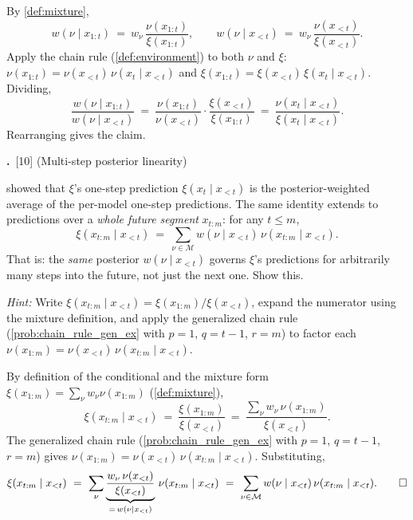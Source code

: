 \documentclass[fontsize=11pt, parskip=half]{scrartcl}
\theoremstyle{definition}
\newenvironment{solution}{%
    \begin{tcolorbox}[colback=black!5!white, colframe=black!50!white,
      title={\textbf{Solution}}, fonttitle=\normalfont, breakable]
  }{\end{tcolorbox}}
\newenvironment{solution}{\expandafter\comment}{\expandafter\endcomment}
\newcommand{\mysubsection}[2]{\par\medskip\noindent\refstepcounter{subsection}\textbf{\thesubsection.}~#2\par\smallskip}
\newcommand{\Mc}{\mathcal{M}}
\begin{document}
\begin{solution}
By \cref{def:mixture},
\[
  w(\nu \mid x_{1:t}) ~=~ w_\nu \,\frac{\nu(x_{1:t})}{\xi(x_{1:t})},
  \qquad
  w(\nu \mid x_{<t}) ~=~ w_\nu \,\frac{\nu(x_{<t})}{\xi(x_{<t})}.
\]
Apply the chain rule (\cref{def:environment}) to both $\nu$ and $\xi$: $\nu(x_{1:t}) = \nu(x_{<t})\,\nu(x_t \mid x_{<t})$ and $\xi(x_{1:t}) = \xi(x_{<t})\,\xi(x_t \mid x_{<t})$. Dividing,
\[
  \frac{w(\nu \mid x_{1:t})}{w(\nu \mid x_{<t})}
  ~=~ \frac{\nu(x_{1:t})}{\nu(x_{<t})} \cdot \frac{\xi(x_{<t})}{\xi(x_{1:t})}
  ~=~ \frac{\nu(x_t \mid x_{<t})}{\xi(x_t \mid x_{<t})}.
\]
Rearranging gives the claim. \qedhere
\end{solution}

\mysubsection{4}{[10] (Multi-step posterior linearity)\label{prob:multi_step_xi_ex}}

 showed that $\xi$'s one-step prediction $\xi(x_t \mid x_{<t})$ is the posterior-weighted average of the per-model one-step predictions. The same identity extends to predictions over a \emph{whole future segment} $x_{t:m}$: for any $t \leq m$,
\[
  \xi(x_{t:m} \mid x_{<t}) ~=~ \sum_{\nu \in \Mc} w(\nu \mid x_{<t})\, \nu(x_{t:m} \mid x_{<t}).
\]
That is: the \emph{same} posterior $w(\nu \mid x_{<t})$ governs $\xi$'s predictions for arbitrarily many steps into the future, not just the next one. Show this.

\textit{Hint:} Write $\xi(x_{t:m} \mid x_{<t}) = \xi(x_{1:m}) / \xi(x_{<t})$, expand the numerator using the mixture definition, and apply the generalized chain rule (\cref{prob:chain_rule_gen_ex} with $p=1$, $q=t-1$, $r=m$) to factor each $\nu(x_{1:m}) = \nu(x_{<t})\,\nu(x_{t:m} \mid x_{<t})$.

\begin{solution}
By definition of the conditional and the mixture form $\xi(x_{1:m}) = \sum_\nu w_\nu \nu(x_{1:m})$ (\cref{def:mixture}),
\[
  \xi(x_{t:m} \mid x_{<t})
  ~=~ \frac{\xi(x_{1:m})}{\xi(x_{<t})}
  ~=~ \frac{\sum_\nu w_\nu\, \nu(x_{1:m})}{\xi(x_{<t})}.
\]
The generalized chain rule (\cref{prob:chain_rule_gen_ex} with $p=1$, $q=t-1$, $r=m$) gives $\nu(x_{1:m}) = \nu(x_{<t})\,\nu(x_{t:m} \mid x_{<t})$. Substituting,
\[
  \xi(x_{t:m} \mid x_{<t})
  ~=~ \sum_\nu \underbrace{\frac{w_\nu\, \nu(x_{<t})}{\xi(x_{<t})}}_{=\, w(\nu \mid x_{<t})}\, \nu(x_{t:m} \mid x_{<t})
  ~=~ \sum_{\nu \in \Mc} w(\nu \mid x_{<t})\, \nu(x_{t:m} \mid x_{<t}). \qedhere
\]
\end{solution}

\end{document}
